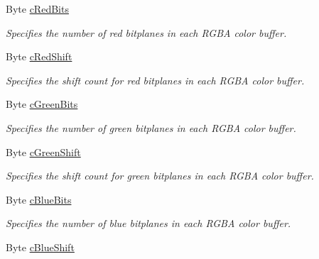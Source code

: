\begin{DoxyCompactItemize}
Byte \hyperlink{struct_tao_1_1_platform_1_1_windows_1_1_gdi_1_1_p_i_x_e_l_f_o_r_m_a_t_d_e_s_c_r_i_p_t_o_r_a71b6b8de02a741921530818f08a2be88}{cRedBits}
\begin{DoxyCompactList}\small\item\em Specifies the number of red bitplanes in each RGBA color buffer. \item\end{DoxyCompactList}\item 
Byte \hyperlink{struct_tao_1_1_platform_1_1_windows_1_1_gdi_1_1_p_i_x_e_l_f_o_r_m_a_t_d_e_s_c_r_i_p_t_o_r_afee35f417dfd8608e8c0690107ebab3b}{cRedShift}
\begin{DoxyCompactList}\small\item\em Specifies the shift count for red bitplanes in each RGBA color buffer. \item\end{DoxyCompactList}\item 
Byte \hyperlink{struct_tao_1_1_platform_1_1_windows_1_1_gdi_1_1_p_i_x_e_l_f_o_r_m_a_t_d_e_s_c_r_i_p_t_o_r_a7f673a48f7d6724469890c48741ba512}{cGreenBits}
\begin{DoxyCompactList}\small\item\em Specifies the number of green bitplanes in each RGBA color buffer. \item\end{DoxyCompactList}\item 
Byte \hyperlink{struct_tao_1_1_platform_1_1_windows_1_1_gdi_1_1_p_i_x_e_l_f_o_r_m_a_t_d_e_s_c_r_i_p_t_o_r_a1acaf61f35f3eb8f1ea75c890b764580}{cGreenShift}
\begin{DoxyCompactList}\small\item\em Specifies the shift count for green bitplanes in each RGBA color buffer. \item\end{DoxyCompactList}\item 
Byte \hyperlink{struct_tao_1_1_platform_1_1_windows_1_1_gdi_1_1_p_i_x_e_l_f_o_r_m_a_t_d_e_s_c_r_i_p_t_o_r_a77e9803e55cb7e08b6aec0af6d2620ba}{cBlueBits}
\begin{DoxyCompactList}\small\item\em Specifies the number of blue bitplanes in each RGBA color buffer. \item\end{DoxyCompactList}\item 
Byte \hyperlink{struct_tao_1_1_platform_1_1_windows_1_1_gdi_1_1_p_i_x_e_l_f_o_r_m_a_t_d_e_s_c_r_i_p_t_o_r_a3731caf144f9cf5935d36f8a75a47dc3}{cBlueShift}

\end{DoxyCompactItemize}
